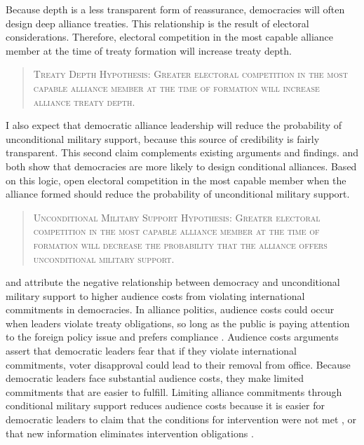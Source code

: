 \documentclass[12pt]{article}
\begin{document}
Because depth is a less transparent form of reassurance, democracies will often design deep alliance treaties. 
This relationship is the result of electoral considerations. 
Therefore, electoral competition in the most capable alliance member at the time of treaty formation will increase treaty depth. 


\begin{quote}
\textsc{Treaty Depth Hypothesis: Greater electoral competition in the most capable alliance member at the time of formation will increase alliance treaty depth.}
\end{quote}   


I also expect that democratic alliance leadership will reduce the probability of unconditional military support, because this source of credibility is fairly transparent. 
This second claim complements existing arguments and findings. 
\citet{Mattes2012} and \citet{Chibaetal2015} both show that democracies are more likely to design conditional alliances. 
Based on this logic, open electoral competition in the most capable member when the alliance formed should reduce the probability of unconditional military support.


\begin{quote}
\textsc{Unconditional Military Support Hypothesis: Greater electoral competition in the most capable alliance member at the time of formation will decrease the probability that the alliance offers unconditional military support.}
\end{quote} 


\citet{Mattes2012} and \citet{Chibaetal2015} attribute the negative relationship between democracy and unconditional military support to higher audience costs from violating international commitments in democracies. 
In alliance politics, audience costs could occur when leaders violate treaty obligations, so long as the public is paying attention to the foreign policy issue \citep{Slantchev2006, PotterBaum2014} and prefers compliance \citep{Chaudoin2014, KertzerBrutger2016}.  
Audience costs arguments assert that democratic leaders fear that if they violate international commitments, voter disapproval could lead to their removal from office.  
Because democratic leaders face substantial audience costs, they make limited commitments that are easier to fulfill. 
Limiting alliance commitments through conditional military support reduces audience costs because it is easier for democratic leaders to claim that the conditions for intervention were not met \citep{FjelstulReiter2019}, or that new information eliminates intervention obligations \citep{LevenduskyHorowitz2012}. 
\end{document}
